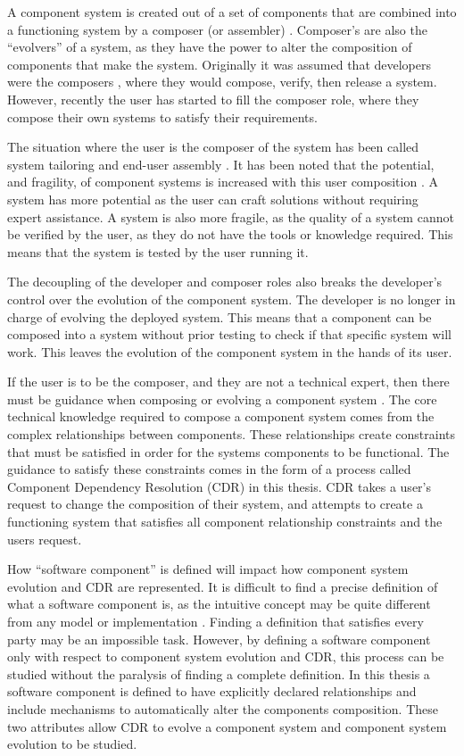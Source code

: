 A component system is created out of a set of components that are combined into a functioning system by a composer (or assembler) \citep{Szyperski2002}.
Composer's are also the ``evolvers'' of a system, as they have the power to alter the composition of components that make the system.
Originally it was assumed that developers were the composers \citep{Parnas1972,PrietoDiaz1987}, where they would compose, verify, then release a system.
However, recently the user has started to fill the composer role, where they compose their own systems to satisfy their requirements.

The situation where the user is the composer of the system has been called system tailoring \citep{Morch1997} and end-user assembly \citep{Szyperski2002}. 
It has been noted that the potential, and fragility, of component systems is increased with this user composition \citep{Szyperski2002}.
A system has more potential as the user can craft solutions without requiring expert assistance.
A system is also more fragile, as the quality of a system cannot be verified by the user, as they do not have the tools or knowledge required.
This means that the system is tested by the user running it. 

The decoupling of the developer and composer roles also breaks the developer's control over the evolution of the component system.
The developer is no longer in charge of evolving the deployed system.
This means that a component can be composed into a system without prior testing to check if that specific system will work.
This leaves the evolution of the component system in the hands of its user.

If the user is to be the composer, and they are not a technical expert, then there must be guidance when composing or evolving a component system \citep{Szyperski2002}.
The core technical knowledge required to compose a component system comes from the complex relationships between components.
These relationships create constraints that must be satisfied in order for the systems components to be functional.
The guidance to satisfy these constraints comes in the form of a process called Component Dependency Resolution (CDR) in this thesis.
CDR takes a user's request to change the composition of their system, and attempts to create a functioning system 
that satisfies all component relationship constraints and the users request.

How ``software component'' is defined will impact how component system evolution and CDR are represented.
It is difficult to find a precise definition of what a software component is, as the intuitive concept may be quite different from any model or implementation \citep{Crnkovic2011}.
Finding a definition that satisfies every party may be an impossible task.
However, by defining a software component only with respect to component system evolution and CDR, 
this process can be studied without the paralysis of finding a complete definition.
In this thesis a software component is defined to have explicitly declared relationships and include mechanisms to automatically alter the components composition.
These two attributes allow CDR to evolve a component system and component system evolution to be studied. 

